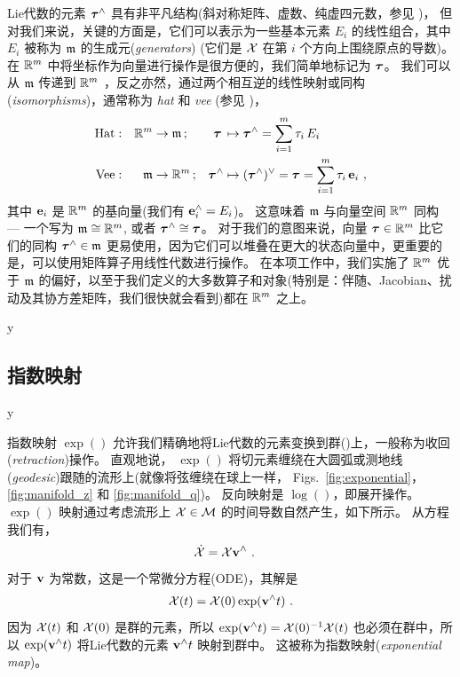 %
Lie代数的元素 ${\bm \tau}^\wedge$ 具有非平凡结构(斜对称矩阵、虚数、纯虚四元数，参见 )，
但对我们来说，关键的方面是，它们可以表示为一些基本元素 $E_i$ 的线性组合，其中 $E_i$ 被称为 $\frak{m}$ 的生成元(\emph{generators}) 
(它们是 $\mathcal{X}$ 在第 $i$ 个方向上围绕原点的导数)。
在 ${\mathbb R}^m$ 中将坐标作为向量进行操作是很方便的，我们简单地标记为 ${\bm \tau}$。
我们可以从 $\frak{m}$ 传递到 ${\mathbb R}^m$ ，反之亦然，通过两个相互逆的线性映射或同构(\emph{isomorphisms})，通常称为 \emph{hat} 和 \emph{vee} (参见 )，
%
\begin{align} 
\textrm{Hat}&:& 
{\mathbb R}^m&\to\frak{m}\,; 
 & 
 {\bm \tau}\,
 &\mapsto {\bm \tau}^\wedge 
 = \sum_{i=1}^m \tau_i\, E_i \label{equ:hat} 
\\
\textrm{Vee}&:& 
 \frak{m}&\to{\mathbb R}^m\,; 
 & {\bm \tau}^\wedge
 & \mapsto ({\bm \tau}^\wedge)^\vee
 ={\bm \tau}
 = \sum_{i=1}^m \tau_i\,{\bf e}_i  \label{equ:vee}
~,
\end{align}
%
其中 ${\bf e}_i$ 是 ${\mathbb R}^m$ 的基向量(我们有 ${\bf e}_i^\wedge=E_i$)。
这意味着 $\frak{m}$ 与向量空间 ${\mathbb R}^m$ 同构 
--- 一个写为 $\frak{m}\cong{\mathbb R}^m$, 或者 ${\bm \tau}^\wedge\cong{\bm \tau}$。
对于我们的意图来说，向量 ${\bm \tau}\in{\mathbb R}^m$ 比它们的同构 ${\bm \tau}^\wedge\in\frak{m}$ 更易使用，因为它们可以堆叠在更大的状态向量中，更重要的是，可以使用矩阵算子用线性代数进行操作。
在本项工作中，我们实施了 ${\mathbb R}^m$ 优于 $\frak{m}$ 的偏好，以至于我们定义的大多数算子和对象(特别是：伴随、Jacobian、扰动及其协方差矩阵，我们很快就会看到)都在 ${\mathbb R}^m$ 之上。



\if\examples y

\fi



\subsection{指数映射}


\if\examples y

\fi

指数映射 $\exp()$ 允许我们精确地将Lie代数的元素变换到群()上，一般称为收回(\emph{retraction})操作。
直观地说， $\exp()$ 将切元素缠绕在大圆弧或测地线(\emph{geodesic})跟随的流形上(就像将弦缠绕在球上一样， Figs.~\ref{fig:exponential}， \ref{fig:manifold_z} 和 \ref{fig:manifold_q})。
反向映射是 $\log()$，即展开操作。
 $\exp()$ 映射通过考虑流形上 $\mathcal{X}\in\mathcal{M}$ 的时间导数自然产生，如下所示。
%
从方程  我们有，
%
\begin{align}\label{equ:ode}
\dot{\mathcal{X}} &= \mathcal{X}{\bf v}^\wedge 
~.
\end{align}
%
对于 ${\bf v}$ 为常数，这是一个常微分方程(ODE)，其解是 
%
\begin{align}\label{equ:exp_at_X}
\mathcal{X}(t)  = \mathcal{X}(0)\exp({\bf v}^\wedge t)
~.
\end{align}
%
因为 $\mathcal{X}(t)$ 和 $\mathcal{X}(0)$ 是群的元素，所以 $\exp({\bf v}^\wedge t)=\mathcal{X}(0)^{-1}\mathcal{X}(t)$ 也必须在群中，所以 $\exp({\bf v}^\wedge t)$ 将Lie代数的元素 ${\bf v}^\wedge t$ 映射到群中。
这被称为指数映射(\emph{exponential map})。

